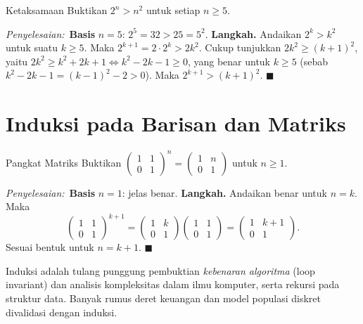 \documentclass[11pt,a4paper]{report}
\theoremstyle{gaya}
\newcommand{\jawab}{\par\smallskip\noindent\textit{\textcolor{oranye}{Penyelesaian:}}\ }
\begin{document}
\begin{contoh}{Ketaksamaan}
Buktikan $2^n>n^2$ untuk setiap $n\ge5$.

\jawab \textbf{Basis} $n=5$: $2^5=32>25=5^2$. \textbf{Langkah.} Andaikan $2^k>k^2$ untuk suatu $k\ge5$. Maka $2^{k+1}=2\cdot2^k>2k^2$. Cukup tunjukkan $2k^2\ge(k+1)^2$, yaitu $2k^2\ge k^2+2k+1\iff k^2-2k-1\ge0$, yang benar untuk $k\ge5$ (sebab $k^2-2k-1=(k-1)^2-2>0$). Maka $2^{k+1}>(k+1)^2$. $\blacksquare$
\end{contoh}

\section{Induksi pada Barisan dan Matriks}
\begin{contoh}{Pangkat Matriks}
Buktikan $\begin{pmatrix}1&1\\0&1\end{pmatrix}^{\!n}=\begin{pmatrix}1&n\\0&1\end{pmatrix}$ untuk $n\ge1$.

\jawab \textbf{Basis} $n=1$: jelas benar. \textbf{Langkah.} Andaikan benar untuk $n=k$. Maka
\[
\begin{pmatrix}1&1\\0&1\end{pmatrix}^{\!k+1}
=\begin{pmatrix}1&k\\0&1\end{pmatrix}\begin{pmatrix}1&1\\0&1\end{pmatrix}
=\begin{pmatrix}1&k+1\\0&1\end{pmatrix}.
\]
Sesuai bentuk untuk $n=k+1$. $\blacksquare$
\end{contoh}

\begin{dunianyata}
Induksi adalah tulang punggung pembuktian \emph{kebenaran algoritma} (loop invariant) dan analisis kompleksitas dalam ilmu komputer, serta rekursi pada struktur data. Banyak rumus deret keuangan dan model populasi diskret divalidasi dengan induksi.
\end{dunianyata}
\end{document}
